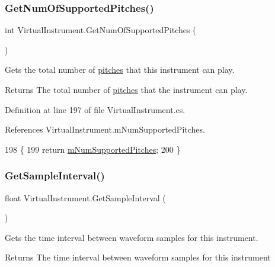 \subsubsection{\texorpdfstring{Get\+Num\+Of\+Supported\+Pitches()}{GetNumOfSupportedPitches()}}
{\footnotesize\ttfamily int Virtual\+Instrument.\+Get\+Num\+Of\+Supported\+Pitches (\begin{DoxyParamCaption}{ }\end{DoxyParamCaption})}



Gets the total number of \hyperlink{group___music_enums_ga508f69b199ea518f935486c990edac1d}{pitches} that this instrument can play. 

\begin{DoxyReturn}{Returns}
The total number of \hyperlink{group___music_enums_ga508f69b199ea518f935486c990edac1d}{pitches} that the instrument can play. 
\end{DoxyReturn}


Definition at line 197 of file Virtual\+Instrument.\+cs.



References Virtual\+Instrument.\+m\+Num\+Supported\+Pitches.


\begin{DoxyCode}
198     \{
199         \textcolor{keywordflow}{return} \hyperlink{group___v_i_base_pro_var_gafc759a16324cf9b3f230bcbf040afcd2}{mNumSupportedPitches};
200     \}
\end{DoxyCode}
\mbox{\label{group___v_i_base_pub_func_gabea22c3ab14c6989b9357da0bf052fbc}} 
\subsubsection{\texorpdfstring{Get\+Sample\+Interval()}{GetSampleInterval()}}
{\footnotesize\ttfamily float Virtual\+Instrument.\+Get\+Sample\+Interval (\begin{DoxyParamCaption}{ }\end{DoxyParamCaption})}



Gets the time interval between waveform samples for this instrument. 

\begin{DoxyReturn}{Returns}
The time interval between waveform samples for this instrument 
\end{DoxyReturn}


